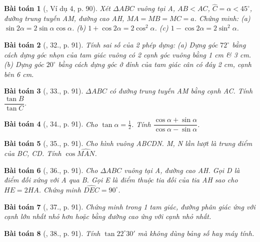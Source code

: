 \documentclass{article}
\newtheorem{baitoan}{Bài toán}
\begin{document}
\begin{baitoan}[\cite{Binh_Toan_9_tap_1}, Ví dụ 4, p. 90]
	Xét $\Delta ABC$ vuông tại A, $AB < AC$, $\widehat{C} = \alpha  < 45^\circ$, đường trung tuyến AM, đường cao AH, $MA = MB = MC = a$. Chứng minh: (a) $\sin2\alpha = 2\sin\alpha\cos\alpha$. (b) $1 + \cos2\alpha = 2\cos^2\alpha$. (c) $1 - \cos2\alpha = 2\sin^2\alpha$.
\end{baitoan}

\begin{baitoan}[\cite{Binh_Toan_9_tap_1}, 32., p. 91]
	Tính sai số của 2 phép dựng: (a) Dựng góc $72^\circ$ bằng cách dựng góc nhọn của tam giác vuông có 2 cạnh góc vuông bằng {\rm1 cm} \& {\rm3 cm}. (b) Dựng góc $20^\circ$ bằng cách dựng góc ở đỉnh của tam giác cân có đáy {\rm2 cm}, cạnh bên {\rm6 cm}.
\end{baitoan}

\begin{baitoan}[\cite{Binh_Toan_9_tap_1}, 33., p. 91]
	$\Delta ABC$ có đường trung tuyến AM bằng cạnh AC. Tính $\dfrac{\tan B}{\tan C}$.
\end{baitoan}

\begin{baitoan}[\cite{Binh_Toan_9_tap_1}, 34., p. 91]
	Cho $\tan\alpha = \frac{1}{2}$. Tính $\dfrac{\cos\alpha + \sin\alpha}{\cos\alpha - \sin\alpha}$.
\end{baitoan}

\begin{baitoan}[\cite{Binh_Toan_9_tap_1}, 35., p. 91]
	Cho hình vuông ABCDN. M, N lần lượt là trung điểm của BC, CD. Tính $\cos\widehat{MAN}$.
\end{baitoan}

\begin{baitoan}[\cite{Binh_Toan_9_tap_1}, 36., p. 91]
	Cho $\Delta ABC$ vuông tại A, đường cao AH. Gọi D là điểm đối xứng với A qua B. Gọi E là điểm thuộc tia đối của tia AH sao cho $HE = 2HA$. Chứng minh $\widehat{DEC} = 90^\circ$.
\end{baitoan}

\begin{baitoan}[\cite{Binh_Toan_9_tap_1}, 37., p. 91]
	Chứng minh trong 1 tam giác, đường phân giác ứng với cạnh lớn nhất nhỏ hơn hoặc bằng đường cao ứng với cạnh nhỏ nhất.
\end{baitoan}

\begin{baitoan}[\cite{Binh_Toan_9_tap_1}, 38., p. 91]
	Tính $\tan22^\circ30'$ mà không dùng bảng số hay máy tính.
\end{baitoan}
\end{document}
